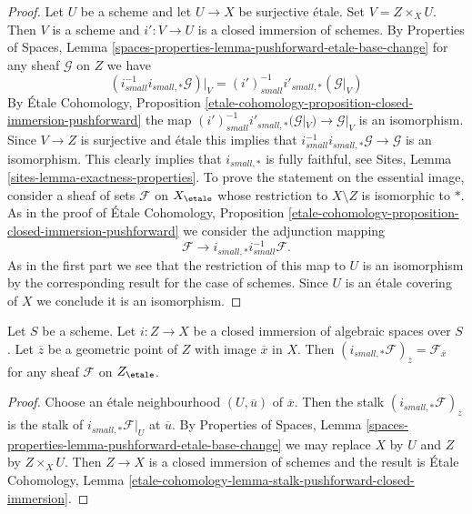 \begin{proof}
Let $U$ be a scheme and let $U \to X$ be surjective \'etale.
Set $V = Z \times_X U$. Then $V$ is a scheme and $i' : V \to U$ is
a closed immersion of schemes. By
Properties of Spaces,
Lemma \ref{spaces-properties-lemma-pushforward-etale-base-change}
for any sheaf $\mathcal{G}$ on $Z$ we have
$$
(i_{small}^{-1}i_{small, *}\mathcal{G})|_V =
(i')_{small}^{-1}i'_{small, *}(\mathcal{G}|_V)
$$
By
\'Etale Cohomology, Proposition
\ref{etale-cohomology-proposition-closed-immersion-pushforward}
the map
$(i')_{small}^{-1}i'_{small, *}(\mathcal{G}|_V) \to \mathcal{G}|_V$
is an isomorphism. Since $V \to Z$ is surjective and \'etale this implies
that $i_{small}^{-1}i_{small, *}\mathcal{G} \to \mathcal{G}$ is an
isomorphism. This clearly implies that $i_{small, *}$ is fully faithful, see
Sites, Lemma \ref{sites-lemma-exactness-properties}.
To prove the statement on the essential image, consider a sheaf of sets
$\mathcal{F}$ on $X_\etale$ whose restriction to $X \setminus Z$ is
isomorphic to $*$. As in the proof of
\'Etale Cohomology, Proposition
\ref{etale-cohomology-proposition-closed-immersion-pushforward}
we consider the adjunction mapping
$$
\mathcal{F} \longrightarrow i_{small, *}i_{small}^{-1}\mathcal{F}.
$$
As in the first part we see that the restriction of this map to
$U$ is an isomorphism by the corresponding result for the case of
schemes. Since $U$ is an \'etale covering of $X$ we
conclude it is an isomorphism.
\end{proof}

\begin{lemma}
\label{lemma-stalk-push-closed}
Let $S$ be a scheme. Let $i : Z \to X$ be a closed immersion of algebraic
spaces over $S$. Let $\overline{z}$ be a geometric point of $Z$ with
image $\overline{x}$ in $X$. Then
$(i_{small, *}\mathcal{F})_{\overline{z}} = \mathcal{F}_{\overline{x}}$
for any sheaf $\mathcal{F}$ on $Z_\etale$.
\end{lemma}

\begin{proof}
Choose an \'etale neighbourhood $(U, \overline{u})$ of $\overline{x}$.
Then the stalk $(i_{small, *}\mathcal{F})_{\overline{z}}$
is the stalk of $i_{small, *}\mathcal{F}|_U$ at $\overline{u}$.
By Properties of Spaces,
Lemma \ref{spaces-properties-lemma-pushforward-etale-base-change}
we may replace $X$ by $U$ and $Z$ by $Z \times_X U$.
Then $Z \to X$ is a closed immersion of schemes and the result is
\'Etale Cohomology, Lemma
\ref{etale-cohomology-lemma-stalk-pushforward-closed-immersion}.
\end{proof}


